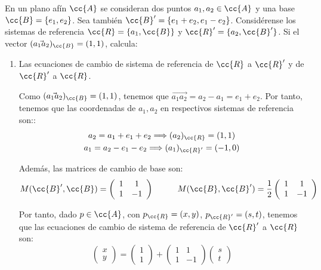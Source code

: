 \begin{ejercicio}
    En un plano afín $\cc{A}$ se consideran dos puntos $a_1, a_2\in \cc{A}$ y una base $\cc{B} = \{e_1, e_2\}$. Sea también $\cc{B}'=\{e_1 + e_2, e_1 - e_2\}$.
    Considérense los sistemas de referencia $\cc{R}=\{a_1,\cc{B}\}$ y $\cc{R}'=\{a_2,\cc{B}'\}$. Si el vector $(\vec{a_1a_2})_\cc{B} = (1, 1)$, calcula:
    \begin{enumerate}
        \item Las ecuaciones de cambio de sistema de referencia de $\cc{R}$ a $\cc{R}'$ y de $\cc{R}'$ a $\cc{R}$.

        Como $(\vec{a_1a_2})_\cc{B} = (1, 1)$, tenemos que $\vec{a_1a_2}=a_2-a_1 = e_1+e_2$. Por tanto, tenemos que las coordenadas de $a_1,a_2$ en respectivos sistemas de referencia son::
        \begin{gather*}
            a_2 = a_1 + e_1+e_2 \Longrightarrow (a_2)_{\cc{R}} = (1,1) \\
            a_1 = a_2 - e_1-e_2 \Longrightarrow (a_1)_{\cc{R}'} = (-1,0)
        \end{gather*}

        Además, las matrices de cambio de base son:
        \begin{equation*}
            M(\cc{B}',\cc{B}) = \left(\begin{array}{cc}
                1 & 1 \\
                1 & -1
            \end{array}\right)
            \hspace{1cm}
            M(\cc{B},\cc{B}') =\frac{1}{2}\left(\begin{array}{cc}
                1 & 1 \\
                1 & -1
            \end{array}\right)
        \end{equation*}

        Por tanto, dado $p\in \cc{A}$, con $p_\cc{R}=(x,y)$, $p_{\cc{R}'}=(s,t)$, tenemos que las ecuaciones de cambio de sistema de referencia de $\cc{R}'$ a $\cc{R}$ son:
        \begin{equation*}
            \left(\begin{array}{c}
                x \\ y
            \end{array}\right)
            = 
            \left(\begin{array}{c}
                1\\ 1
            \end{array}\right)
            +
            \left(\begin{array}{ccc}
                1 & 1 \\
                1 & -1
            \end{array}\right)
            \left(\begin{array}{c}
                s \\ t
            \end{array}\right)
        \end{equation*}


\end{enumerate}
\end{ejercicio}
